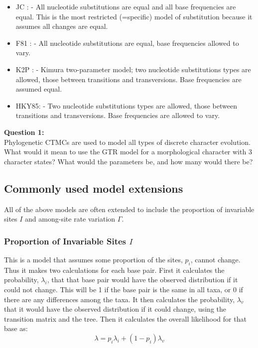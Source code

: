 \documentclass[11pt]{article}
\begin{document}
\begin{itemize}

\item JC : \citet{jukes1969evolution} - All nucleotide substitutions are equal and all base frequencies are equal. This is the most restricted (=specific) model of substitution because it assumes all changes are equal.

\item F81 : \citet{felsenstein1981evolutionary} - All nucleotide substitutions are equal, base frequencies allowed to vary.

\item K2P : \citet{kimura1980simple} - Kimura two-parameter model; two nucleotide substitutions types are allowed, those between transitions and transversions. Base frequencies are assumed equal.

\item HKY85: \citet{hasegawa1985dating} - Two nucleotide substitutions types are allowed, those between transitions and transversions.  Base frequencies are allowed to vary.

\end{itemize}


\begin{framed}
\noindent
\textbf{Question 1:} \\
Phylogenetic CTMCs are used to model all types of discrete character evolution.
What would it mean to use the GTR model for a morphological character with 3 character states?
What would the parameters be, and how many would there be?
\end{framed}

\subsection{Commonly used model extensions}

All of the above models are often extended to include the proportion of invariable sites $I$
and among-site rate variation $\Gamma$.

\subsubsection{Proportion of Invariable Sites $I$}

This is a model that assumes some proportion of the sites, $p_i$, cannot change.  
Thus it makes two calculations for each base pair.  
First it calculates the probability, $\lambda_i$, that that base pair would have the observed distribution if it could not change.  
This will be 1 if the base pair is the same in all taxa, or 0 if there are any differences among the taxa.  
It then calculates the probability, $\lambda_v$ that it would have the observed distribution if it could change, 
using the transition matrix and the tree.  
Then it calculates the overall likelihood for that base as:
\begin{equation*}
\lambda = p_i \lambda_i + (1 - p_i) \lambda_v
\end{equation*}
\end{document}
